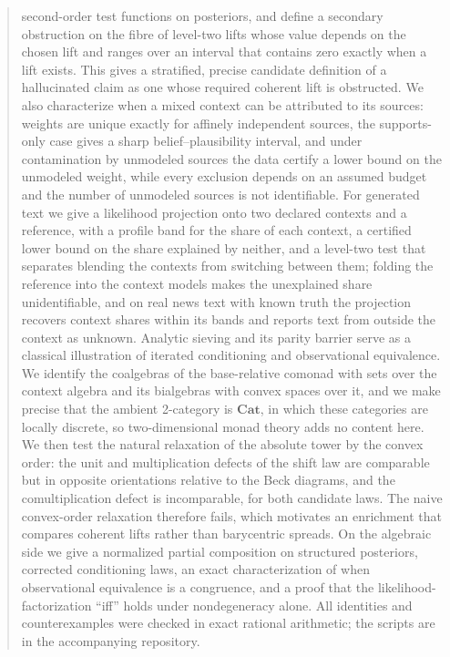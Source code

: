 \documentclass[11pt]{article}
\theoremstyle{definition}
\theoremstyle{remark}
\begin{document}
\begin{abstract}
second-order test functions on posteriors, and define a secondary obstruction on the fibre of
level-two lifts whose value depends on the chosen lift and ranges over an interval that contains zero
exactly when a lift exists. This gives a stratified, precise candidate definition of a hallucinated
claim as one whose required coherent lift is obstructed. We also characterize when a mixed context
can be attributed to its sources: weights are unique exactly for affinely independent sources, the
supports-only case gives a sharp belief--plausibility interval, and under contamination by unmodeled
sources the data certify a lower bound on the unmodeled weight, while every exclusion depends on an
assumed budget and the number of unmodeled sources is not identifiable. For generated text we give a likelihood projection onto two declared contexts and a reference, with a profile band for the share of each context, a certified lower bound on the share explained by neither, and a level-two test that separates blending the contexts from switching between them; folding the reference into the context models makes the unexplained share unidentifiable, and on real news text with known truth the projection recovers context shares within its bands and reports text from outside the context as unknown. Analytic sieving and its
parity barrier serve as a classical illustration of iterated conditioning and observational
equivalence. We identify
the coalgebras of the base-relative comonad with sets over the context algebra and its bialgebras
with convex spaces over it, and we make precise that the ambient 2-category is $\mathbf{Cat}$, in which
these categories are locally discrete, so two-dimensional monad theory adds no content here. We then
test the natural relaxation of the absolute tower by the convex order: the unit and multiplication
defects of the shift law are comparable but in opposite orientations relative to the Beck diagrams,
and the comultiplication defect is incomparable, for both candidate laws. The naive convex-order
relaxation therefore fails, which motivates an enrichment that compares coherent lifts rather than
barycentric spreads. On the
algebraic side we give a normalized partial composition on structured posteriors, corrected
conditioning laws, an exact characterization of when observational equivalence is a congruence, and
a proof that the likelihood-factorization ``iff'' holds under nondegeneracy alone. All identities and
counterexamples were checked in exact rational arithmetic; the scripts are in the accompanying
repository.
\end{abstract}
\end{document}
